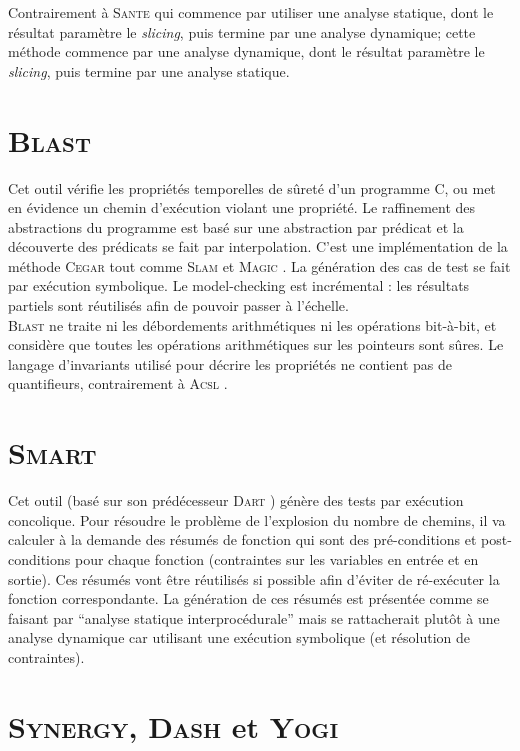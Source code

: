 Contrairement à \textsc{Sante} \cite{SANTE} qui commence par utiliser une
analyse statique, dont le résultat paramètre le {\em slicing}, puis termine par
une analyse dynamique; cette méthode commence par une analyse dynamique, dont
le résultat paramètre le {\em slicing}, puis termine par une analyse statique.

\section{\textsc{Blast}}

Cet outil \cite{BLAST} vérifie les propriétés temporelles de sûreté d'un
programme C, ou met en évidence un chemin d'exécution violant une propriété. Le
raffinement des abstractions du programme est basé sur une abstraction par
prédicat et la découverte des prédicats se fait par interpolation. C'est une
implémentation de la méthode \textsc{Cegar} \cite{CEGAR} tout comme
\textsc{Slam} \cite{SLAM} et \textsc{Magic} \cite{MAGIC}. La génération des cas
de test se fait par exécution symbolique. Le model-checking est incrémental :
les résultats partiels sont réutilisés afin de pouvoir passer à l'échelle.\\

\textsc{Blast} ne traite ni les débordements arithmétiques ni les opérations
bit-à-bit, et considère que toutes les opérations arithmétiques sur les
pointeurs sont sûres. Le langage d'invariants utilisé pour décrire les
propriétés ne contient pas de quantifieurs, contrairement à \textsc{Acsl}
\cite{ACSL}.

\section{\textsc{Smart}}

Cet outil \cite{SMART} (basé sur son prédécesseur \textsc{Dart} \cite{DART})
génère des tests par exécution concolique. Pour résoudre le problème de
l'explosion du nombre de chemins, il va calculer à la demande des résumés de
fonction qui sont des pré-conditions et post-conditions pour chaque fonction
(contraintes sur les variables en entrée et en sortie). Ces résumés vont être
réutilisés si possible afin d'éviter de ré-exécuter la fonction correspondante.
La génération de ces résumés est présentée comme se faisant par ``analyse
statique interprocédurale'' mais se rattacherait plutôt à une analyse dynamique
car utilisant une exécution symbolique (et résolution de contraintes).

\section{\textsc{Synergy}, \textsc{Dash} et \textsc{Yogi}}

